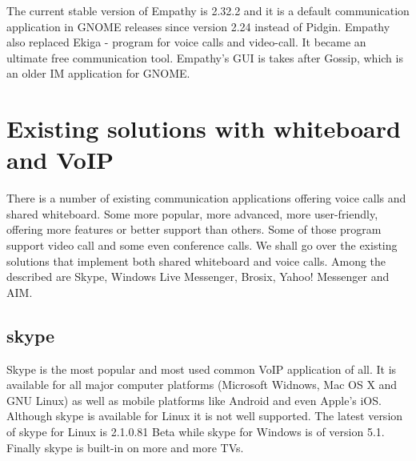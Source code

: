The current stable version of Empathy is 2.32.2 and it is a default communication application in GNOME releases since version 2.24 instead of Pidgin. Empathy also replaced Ekiga - program for voice calls and video-call. It became an ultimate free communication tool. Empathy's GUI is takes after Gossip, which is an older IM application for GNOME. 


\chapter{Existing solutions with whiteboard and VoIP}


There is a number of existing communication applications offering voice calls and shared whiteboard. Some more popular, more advanced, more user-friendly, offering more features or better support than others. Some of those program support video call and some even conference calls. We shall go over the existing solutions that implement both shared whiteboard and voice calls. Among the described are Skype\cite{skype}, Windows Live Messenger\cite{WindowsLiveMessenger}, Brosix\cite{brosix}, Yahoo! Messenger\cite{yahoo} and AIM\cite{AIM}.

\section*{skype}
Skype is the most popular and most used common VoIP application of all. It is available for all major computer platforms (Microsoft Widnows, Mac OS X and GNU Linux) as well as mobile platforms like Android and even Apple's iOS. Although skype is available for Linux it is not well supported. The latest version of skype for Linux is 2.1.0.81 Beta while skype for Windows is of version 5.1. Finally skype is built-in on more and more TVs.

